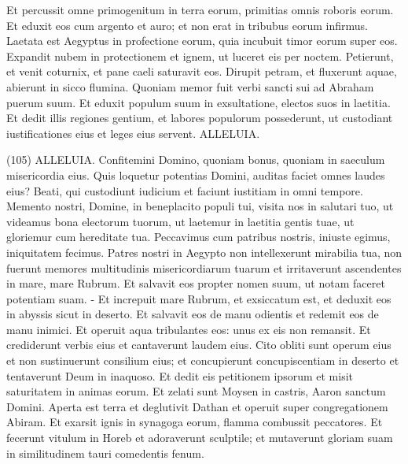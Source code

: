 \begin{biblechapter}
\verse Et percussit omne primogenitum in terra eorum, primitias omnis roboris eorum. 
\verse Et eduxit eos cum argento et auro; et non erat in tribubus eorum infirmus. 
\verse Laetata est Aegyptus in profectione eorum, quia incubuit timor eorum super eos. 
\verse Expandit nubem in protectionem et ignem, ut luceret eis per noctem. 
\verse Petierunt, et venit coturnix, et pane caeli saturavit eos. 
\verse Dirupit petram, et fluxerunt aquae, abierunt in sicco flumina. 
\verse Quoniam memor fuit verbi sancti sui ad Abraham puerum suum. 
\verse Et eduxit populum suum in exsultatione, electos suos in laetitia. 
\verse Et dedit illis regiones gentium, et labores populorum possederunt, 
\verse ut custodiant iustificationes eius et leges eius servent. ALLELUIA. 
\end{biblechapter}

\begin{biblechapter}  (105) 
\verse ALLELUIA. Confitemini Domino, quoniam bonus, quoniam in saeculum misericordia eius. 
\verse Quis loquetur potentias Domini, auditas faciet omnes laudes eius? 
\verse Beati, qui custodiunt iudicium et faciunt iustitiam in omni tempore. 
\verse Memento nostri, Domine, in beneplacito populi tui, visita nos in salutari tuo, 
\verse ut videamus bona electorum tuorum, ut laetemur in laetitia gentis tuae, ut gloriemur cum hereditate tua. 
\verse Peccavimus cum patribus nostris, iniuste egimus, iniquitatem fecimus. 
\verse Patres nostri in Aegypto non intellexerunt mirabilia tua, non fuerunt memores multitudinis misericordiarum tuarum et irritaverunt ascendentes in mare, mare Rubrum. 
\verse Et salvavit eos propter nomen suum, ut notam faceret potentiam suam. - 
\verse Et increpuit mare Rubrum, et exsiccatum est, et deduxit eos in abyssis sicut in deserto. 
\verse Et salvavit eos de manu odientis et redemit eos de manu inimici. 
\verse Et operuit aqua tribulantes eos: unus ex eis non remansit. 
\verse Et crediderunt verbis eius et cantaverunt laudem eius. 
\verse Cito obliti sunt operum eius et non sustinuerunt consilium eius; 
\verse et concupierunt concupiscentiam in deserto et tentaverunt Deum in inaquoso. 
\verse Et dedit eis petitionem ipsorum et misit saturitatem in animas eorum. 
\verse Et zelati sunt Moysen in castris, Aaron sanctum Domini. 
\verse Aperta est terra et deglutivit Dathan et operuit super congregationem Abiram. 
\verse Et exarsit ignis in synagoga eorum, flamma combussit peccatores. 
\verse Et fecerunt vitulum in Horeb et adoraverunt sculptile; 
\verse et mutaverunt gloriam suam in similitudinem tauri comedentis fenum. 

\end{biblechapter}
